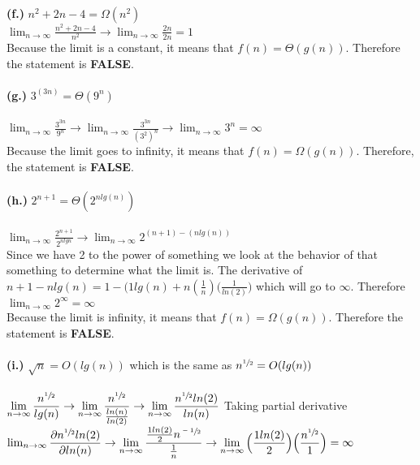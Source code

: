 \documentclass[10pt]{article}
\begin{document}
\textbf{(f.)} $n^2+2n-4= \Omega (n^2)$\\
$\displaystyle \lim_{n\to \infty} \displaystyle \frac{n^2+2n-4}{n^2} \rightarrow \lim_{n\to \infty} \displaystyle \frac{2n}{2n}= 1 $\\
Because the limit is a constant, it means that $f(n) = \Theta(g(n))$. Therefore the statement is \textbf{FALSE}.\\\\
\textbf{(g.)} $3^(3n)= \Theta (9^n)$\\\\
$\displaystyle \lim_{n\to \infty} \displaystyle \frac{3^{3n}}{9^n} \rightarrow \lim_{n\to \infty} \displaystyle \frac{3^{3n}}{(3^2)^n} \rightarrow \lim_{n\to \infty} \displaystyle 3^n= \infty$\\
Because the limit goes to infinity, it means that $f(n) = \Omega(g(n))$. Therefore, the statement is \textbf{FALSE}. \\\\
\textbf{(h.)} $2^{n+1} = \Theta(2^{nlg(n)})$\\\\
$\displaystyle \lim_{n\to \infty} \displaystyle \frac{2^{n+1}}{2^{nlgn}} \rightarrow \lim_{n\to \infty} \displaystyle 2^{(n+1) - (nlg(n))}$\\ Since we have 2 to the power of something we look at the behavior of that something to determine what the limit is. The derivative of $n+1 - n lg(n) = 1-(1lg(n)+n(\frac{1}{n})\Big(\frac{1}{ln(2)}\Big)$ which will go to $\infty$. Therefore  
$\displaystyle \lim_{n\to \infty} \displaystyle 2^\infty = \infty$\\
Because the limit is infinity, it means that $f(n) = \Omega(g(n))$. Therefore the statement is \textbf{FALSE}.\\\\
\textbf{(i.)} $\sqrt{n}= O(lg(n))$ which is the same as $n^{\sfrac{1}{2}}= O(lg(n))$\\\\
$\displaystyle \lim_{n\to \infty} \displaystyle \frac{n^{\sfrac{1}{2}}}{lg(n)} \rightarrow \lim_{n\to \infty} \displaystyle \frac{n^{\sfrac{1}{2}}}{\frac{ln(n)}{ln(2)}} \rightarrow \lim_{n\to \infty} \displaystyle \frac{n^{\sfrac{1}{2}}ln(2)}{ln(n)}$ Taking partial derivative\\ $\lim_{n\to \infty} \displaystyle \frac{\partial n^{\sfrac{1}{2}}ln(2)}{\partial ln(n)} \rightarrow \lim_{n\to \infty} \displaystyle \frac{\frac{1ln(2)}{2} n^{\sfrac{-1}{2}}}{\frac{1}{n}} \rightarrow \lim_{n\to \infty} \displaystyle \Big(\frac{1ln(2)}{2}\Big) \Big(\frac{n^{\sfrac{1}{2}}}{1}\Big) = \infty$ \\
\end{document}

